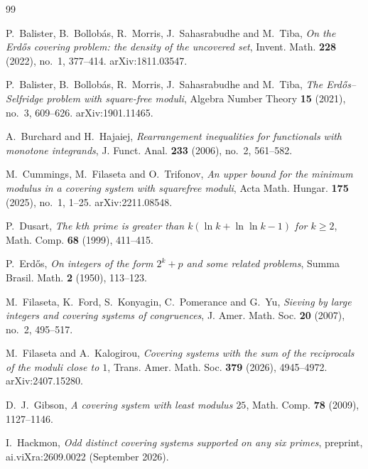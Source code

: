\begin{thebibliography}{99}

P.~Balister, B.~Bollob\'as, R.~Morris, J.~Sahasrabudhe and M.~Tiba,
\emph{On the {E}rd\H{o}s covering problem: the density of the uncovered set},
Invent. Math. \textbf{228} (2022), no.~1, 377--414. arXiv:1811.03547.

P.~Balister, B.~Bollob\'as, R.~Morris, J.~Sahasrabudhe and M.~Tiba,
\emph{The {E}rd\H{o}s--{S}elfridge problem with square-free moduli},
Algebra Number Theory \textbf{15} (2021), no.~3, 609--626. arXiv:1901.11465.

A.~Burchard and H.~Hajaiej,
\emph{Rearrangement inequalities for functionals with monotone integrands},
J. Funct. Anal. \textbf{233} (2006), no.~2, 561--582.

M.~Cummings, M.~Filaseta and O.~Trifonov,
\emph{An upper bound for the minimum modulus in a covering system with squarefree moduli},
Acta Math. Hungar. \textbf{175} (2025), no.~1, 1--25. arXiv:2211.08548.

P.~Dusart,
\emph{The $k$th prime is greater than $k(\ln k+\ln\ln k-1)$ for $k\ge2$},
Math. Comp. \textbf{68} (1999), 411--415.

P.~Erd\H{o}s,
\emph{On integers of the form $2^k+p$ and some related problems},
Summa Brasil. Math. \textbf{2} (1950), 113--123.

M.~Filaseta, K.~Ford, S.~Konyagin, C.~Pomerance and G.~Yu,
\emph{Sieving by large integers and covering systems of congruences},
J. Amer. Math. Soc. \textbf{20} (2007), no.~2, 495--517.

M.~Filaseta and A.~Kalogirou,
\emph{Covering systems with the sum of the reciprocals of the moduli close to $1$},
Trans. Amer. Math. Soc. \textbf{379} (2026), 4945--4972. arXiv:2407.15280.

D.~J.~Gibson,
\emph{A covering system with least modulus $25$},
Math. Comp. \textbf{78} (2009), 1127--1146.

I.~Hackmon, \emph{Odd distinct covering systems supported on any six primes}, preprint, ai.viXra:2609.0022
(September 2026).


\end{thebibliography}
